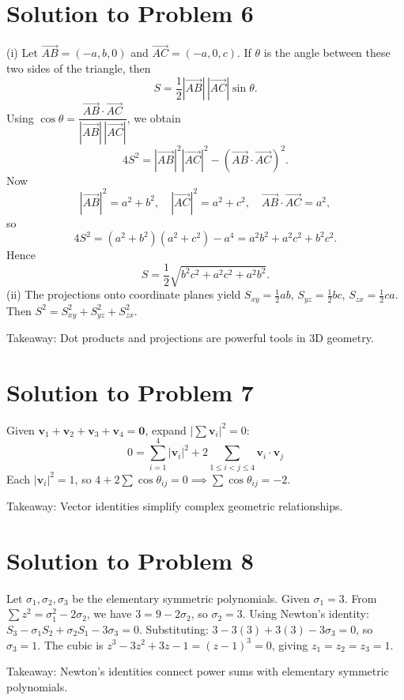 \section*{Solution to Problem 6}
(i) Let $\vec{AB} = (-a,b,0)$ and $\vec{AC} = (-a,0,c)$. If $\theta$ is the angle between these two sides of the triangle, then
\[
S = \frac12 |\vec{AB}|\,|\vec{AC}|\sin\theta.
\]
Using $\cos\theta = \dfrac{\vec{AB}\cdot\vec{AC}}{|\vec{AB}|\,|\vec{AC}|}$, we obtain
\[
4S^2 = |\vec{AB}|^2 |\vec{AC}|^2 - (\vec{AB}\cdot\vec{AC})^2.
\]
Now
\[
|\vec{AB}|^2 = a^2+b^2,\quad |\vec{AC}|^2 = a^2+c^2,\quad \vec{AB}\cdot\vec{AC}=a^2,
\]
so
\[
4S^2 = (a^2+b^2)(a^2+c^2)-a^4 = a^2b^2+a^2c^2+b^2c^2.
\]
Hence
\[
S = \frac{1}{2} \sqrt{b^2 c^2 + a^2 c^2 + a^2 b^2}.
\]
(ii) The projections onto coordinate planes yield $S_{xy} = \frac{1}{2} ab$, $S_{yz} = \frac{1}{2} bc$, $S_{zx} = \frac{1}{2} ca$. Then $S^2 = S_{xy}^2 + S_{yz}^2 + S_{zx}^2$.

Takeaway: Dot products and projections are powerful tools in 3D geometry.

\section*{Solution to Problem 7}
Given $\mathbf{v}_1 + \mathbf{v}_2 + \mathbf{v}_3 + \mathbf{v}_4 = \mathbf{0}$, expand $|\sum \mathbf{v}_i|^2 = 0$:
\[
0 = \sum_{i=1}^4 |\mathbf{v}_i|^2 + 2\sum_{1 \leq i < j \leq 4} \mathbf{v}_i \cdot \mathbf{v}_j
\]
Each $|\mathbf{v}_i|^2 = 1$, so $4 + 2\sum \cos \theta_{ij} = 0 \implies \sum \cos \theta_{ij} = -2$.

Takeaway: Vector identities simplify complex geometric relationships.

\section*{Solution to Problem 8}
Let $\sigma_1, \sigma_2, \sigma_3$ be the elementary symmetric polynomials. Given $\sigma_1 = 3$.
From $\sum z^2 = \sigma_1^2 - 2\sigma_2$, we have $3 = 9 - 2\sigma_2$, so $\sigma_2 = 3$.
Using Newton's identity: $S_3 - \sigma_1 S_2 + \sigma_2 S_1 - 3\sigma_3 = 0$.
Substituting: $3 - 3(3) + 3(3) - 3\sigma_3 = 0$, so $\sigma_3 = 1$.
The cubic is $z^3 - 3z^2 + 3z - 1 = (z-1)^3 = 0$, giving $z_1 = z_2 = z_3 = 1$.

Takeaway: Newton's identities connect power sums with elementary symmetric polynomials.

